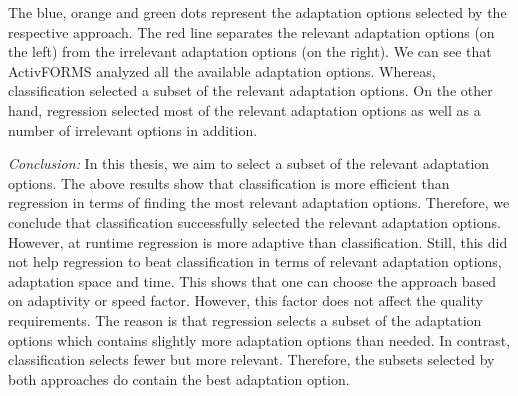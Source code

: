 \documentclass[a4paper,12pt]{article}
\begin{document}
The blue, orange and green dots represent the adaptation options selected by the respective approach. The red line separates the relevant adaptation options (on the left) from the irrelevant adaptation options (on the right). We can see that ActivFORMS analyzed all the available adaptation options. Whereas, classification selected a subset of the relevant adaptation options. On the other hand, regression selected most of the relevant adaptation options as well as a number of irrelevant options in addition.

\emph{Conclusion:} In this thesis, we aim to select a subset of the relevant adaptation options. The above results show that classification is more efficient than regression in terms of finding the most relevant adaptation options. Therefore, we conclude that classification successfully selected the relevant adaptation options. However, at runtime regression is more adaptive than classification. Still, this did not help regression to beat classification in terms of relevant adaptation options, adaptation space and time. This shows that one can choose the approach based on adaptivity or speed factor. However, this factor does not affect the quality requirements. The reason is that regression selects a subset of the adaptation options which contains slightly more adaptation options than needed. In contrast, classification selects fewer but more relevant. Therefore, the subsets selected by both approaches do contain the best adaptation option.


\end{document}

